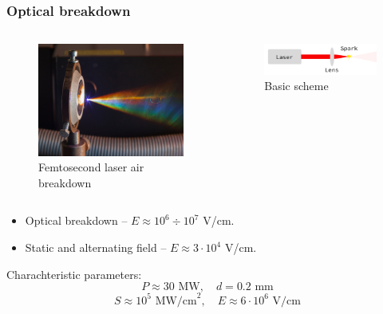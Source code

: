 \documentclass{beamer}
\begin{document}
	\begin{frame}
		\frametitle{Optical breakdown}
		\begin{columns}
			\begin{figure}
				\centering
				\includegraphics[width=1.05\linewidth]{res/new_femtosecond_laser_spark.jpg}
				\caption*{Femtosecond laser air breakdown}
			\end{figure}
			
			\begin{figure}
				\centering
				\includegraphics[width=1.0\linewidth]{res/scheme.png}
				\caption*{Basic scheme}
			\end{figure}
			
			
		\end{columns}
		\begin{itemize}
			\item Optical breakdown -- $E \approx 10^6 \div 10^7$ V/cm. 
			\item Static and alternating field -- $E \approx 3 \cdot 10^4$ V/cm.
		\end{itemize}
		Charachteristic parameters:
		$$ P \approx 30 \text{ MW}, \quad d = 0.2 \text{ mm} $$
		$$ S \approx 10^5 \text{ MW/cm}^2, \quad E \approx 6 \cdot 10^6 \text{ V/cm} $$
		
		
		
	\end{frame}
	
\end{document}
